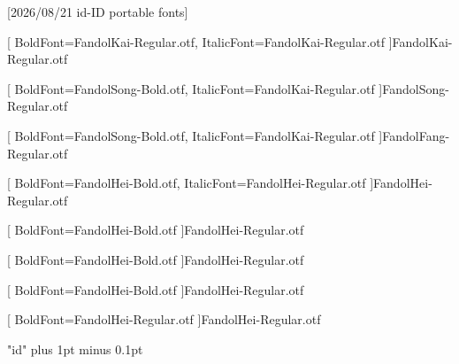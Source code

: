 [2026/08/21 id-ID portable fonts]

\setsansfont{TeX Gyre Heros}




[
  BoldFont=FandolKai-Regular.otf,
  ItalicFont=FandolKai-Regular.otf
]{FandolKai-Regular.otf}

[
  BoldFont=FandolSong-Bold.otf,
  ItalicFont=FandolKai-Regular.otf
]{FandolSong-Regular.otf}

[
  BoldFont=FandolSong-Bold.otf,
  ItalicFont=FandolKai-Regular.otf
]{FandolFang-Regular.otf}

[
  BoldFont=FandolHei-Bold.otf,
  ItalicFont=FandolHei-Regular.otf
]{FandolHei-Regular.otf}

[
  BoldFont=FandolHei-Bold.otf
]{FandolHei-Regular.otf}

[
  BoldFont=FandolHei-Bold.otf
]{FandolHei-Regular.otf}

[
  BoldFont=FandolHei-Bold.otf
]{FandolHei-Regular.otf}

[
  BoldFont=FandolHei-Regular.otf
]{FandolHei-Regular.otf}

\XeTeXlinebreaklocale "id"
\XeTeXlinebreakskip=0pt plus 1pt minus 0.1pt

\newcommand\kaishu{\CJKfamily{kai}}
\newcommand\songti{\CJKfamily{song}}
\newcommand\heiti{\CJKfamily{hei}}
\newcommand\thmheiti{\CJKfamily{hei2}}
\newcommand\fangsong{\CJKfamily{fangsong}}
\renewcommand{\em}{\bfseries\mathversion{bold}\CJKfamily{emfont}}

